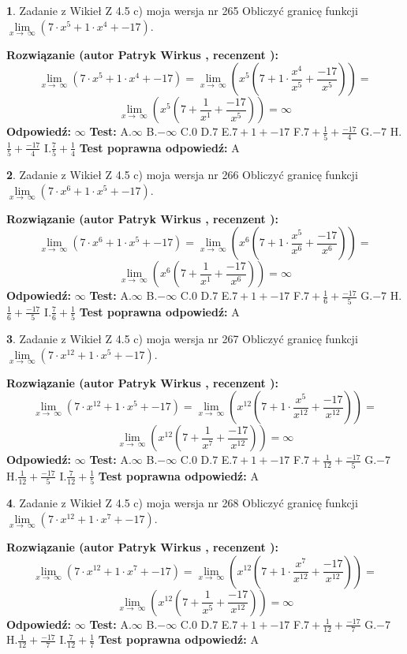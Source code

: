 \documentclass[12pt, a4paper]{article}
\theoremstyle{definition} %
\newtheorem{zad}{}
\newcommand{\zadStart}[1]{\begin{zad}#1\newline}
\newcommand{\zadStop}{\end{zad}}
\newcommand{\rozwStart}[2]{\noindent \textbf{Rozwiązanie (autor #1 , recenzent #2): }\newline}
\newcommand{\rozwStop}{\newline}
\newcommand{\odpStart}{\noindent \textbf{Odpowiedź:}\newline}
\newcommand{\odpStop}{\newline}
\newcommand{\testStart}{\noindent \textbf{Test:}\newline}
\newcommand{\testStop}{\newline}
\newcommand{\kluczStart}{\noindent \textbf{Test poprawna odpowiedź:}\newline}
\newcommand{\kluczStop}{\newline}
\begin{document}
\zadStart{Zadanie z Wikieł Z 4.5 c) moja wersja nr 265}
Obliczyć granicę funkcji  $\lim\limits_{x\to\ \infty}(7 \cdot x^{5}+1 \cdot x^{4}+-17)$.
\zadStop
\rozwStart{Patryk Wirkus}{}
$$\lim\limits_{x\to\ \infty}(7 \cdot x^{5}+1 \cdot x^{4}+-17) = \lim\limits_{x\to\ \infty}(x^{5}(7 +1 \cdot \frac{x^{4}}{x^{5}}+\frac{-17}{x^{5}})) =$$ $$\lim\limits_{x\to\ \infty}(x^{5}(7 +\frac{1}{x^{1}}+\frac{-17}{x^{5}})) =\infty$$
\rozwStop
\odpStart
$\infty$
\odpStop
\testStart
A.$\infty$ B.$-\infty$ C.$0$ D.$7$ E.$7 + 1 + -17$
F.$7+\frac{1}{5}+\frac{-17}{4}$ G.$-7$
H.$\frac{1}{5}+\frac{-17}{4}$
I.$\frac{7}{5}+\frac{1}{4}$
\testStop
\kluczStart
A
\kluczStop



\zadStart{Zadanie z Wikieł Z 4.5 c) moja wersja nr 266}
Obliczyć granicę funkcji  $\lim\limits_{x\to\ \infty}(7 \cdot x^{6}+1 \cdot x^{5}+-17)$.
\zadStop
\rozwStart{Patryk Wirkus}{}
$$\lim\limits_{x\to\ \infty}(7 \cdot x^{6}+1 \cdot x^{5}+-17) = \lim\limits_{x\to\ \infty}(x^{6}(7 +1 \cdot \frac{x^{5}}{x^{6}}+\frac{-17}{x^{6}})) =$$ $$\lim\limits_{x\to\ \infty}(x^{6}(7 +\frac{1}{x^{1}}+\frac{-17}{x^{6}})) =\infty$$
\rozwStop
\odpStart
$\infty$
\odpStop
\testStart
A.$\infty$ B.$-\infty$ C.$0$ D.$7$ E.$7 + 1 + -17$
F.$7+\frac{1}{6}+\frac{-17}{5}$ G.$-7$
H.$\frac{1}{6}+\frac{-17}{5}$
I.$\frac{7}{6}+\frac{1}{5}$
\testStop
\kluczStart
A
\kluczStop



\zadStart{Zadanie z Wikieł Z 4.5 c) moja wersja nr 267}
Obliczyć granicę funkcji  $\lim\limits_{x\to\ \infty}(7 \cdot x^{12}+1 \cdot x^{5}+-17)$.
\zadStop
\rozwStart{Patryk Wirkus}{}
$$\lim\limits_{x\to\ \infty}(7 \cdot x^{12}+1 \cdot x^{5}+-17) = \lim\limits_{x\to\ \infty}(x^{12}(7 +1 \cdot \frac{x^{5}}{x^{12}}+\frac{-17}{x^{12}})) =$$ $$\lim\limits_{x\to\ \infty}(x^{12}(7 +\frac{1}{x^{7}}+\frac{-17}{x^{12}})) =\infty$$
\rozwStop
\odpStart
$\infty$
\odpStop
\testStart
A.$\infty$ B.$-\infty$ C.$0$ D.$7$ E.$7 + 1 + -17$
F.$7+\frac{1}{12}+\frac{-17}{5}$ G.$-7$
H.$\frac{1}{12}+\frac{-17}{5}$
I.$\frac{7}{12}+\frac{1}{5}$
\testStop
\kluczStart
A
\kluczStop



\zadStart{Zadanie z Wikieł Z 4.5 c) moja wersja nr 268}
Obliczyć granicę funkcji  $\lim\limits_{x\to\ \infty}(7 \cdot x^{12}+1 \cdot x^{7}+-17)$.
\zadStop
\rozwStart{Patryk Wirkus}{}
$$\lim\limits_{x\to\ \infty}(7 \cdot x^{12}+1 \cdot x^{7}+-17) = \lim\limits_{x\to\ \infty}(x^{12}(7 +1 \cdot \frac{x^{7}}{x^{12}}+\frac{-17}{x^{12}})) =$$ $$\lim\limits_{x\to\ \infty}(x^{12}(7 +\frac{1}{x^{5}}+\frac{-17}{x^{12}})) =\infty$$
\rozwStop
\odpStart
$\infty$
\odpStop
\testStart
A.$\infty$ B.$-\infty$ C.$0$ D.$7$ E.$7 + 1 + -17$
F.$7+\frac{1}{12}+\frac{-17}{7}$ G.$-7$
H.$\frac{1}{12}+\frac{-17}{7}$
I.$\frac{7}{12}+\frac{1}{7}$
\testStop
\kluczStart
A
\kluczStop
\end{document}

